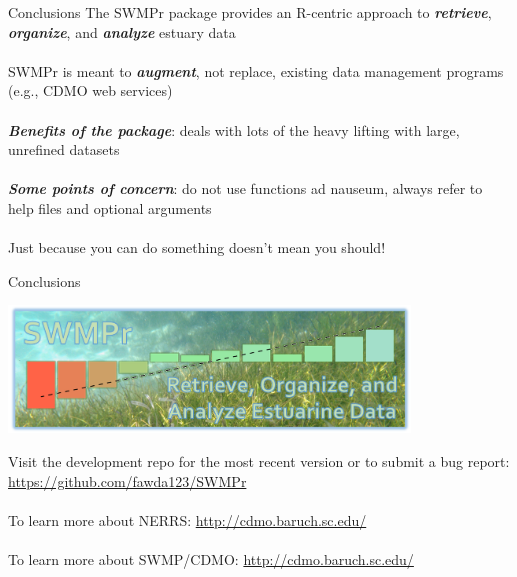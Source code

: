 \documentclass[serif]{beamer}\usepackage[]{graphicx}\usepackage[]{color}
\newcommand{\Bigtxt}[1]{\textbf{\textit{#1}}}
\begin{document}
\begin{frame}{Conclusions}
The SWMPr package provides an R-centric approach to \Bigtxt{retrieve}, \Bigtxt{organize}, and \Bigtxt{analyze} estuary data \\~\\
SWMPr is meant to \Bigtxt{augment}, not replace, existing data management programs (e.g., CDMO web services) \\~\\
\Bigtxt{Benefits of the package}: deals with lots of the heavy lifting with large, unrefined datasets \\~\\
\Bigtxt{Some points of concern}: do not use functions ad nauseum, always refer to help files and optional arguments\\~\\
Just because you can do something doesn't mean you should!
\end{frame}

\begin{frame}{Conclusions}
\centerline{\includegraphics[width = 0.8\textwidth]{fig/swmpr_logo.png}}
\vspace{0.15in}
Visit the development repo for the most recent version or to submit a bug report: \href{https://github.com/fawda123/SWMPr}{https://github.com/fawda123/SWMPr}\\~\\
To learn more about NERRS: \href{http://www.nerrs.noaa.gov/}{http://cdmo.baruch.sc.edu/} \\~\\
To learn more about SWMP/CDMO: \href{http://cdmo.baruch.sc.edu/}{http://cdmo.baruch.sc.edu/}
\end{frame}
\end{document}
